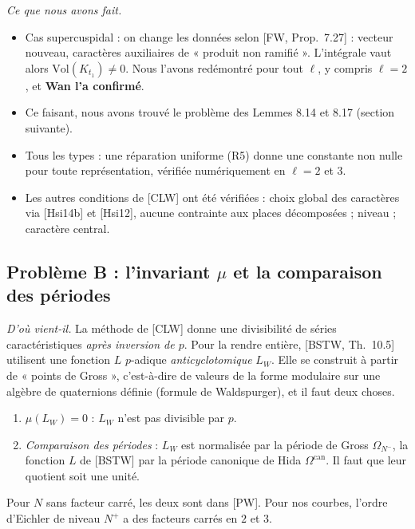 \documentclass[11pt]{amsart}
\newcommand{\Vol}{\mathrm{Vol}}
\begin{document}
\emph{Ce que nous avons fait.}
\begin{itemize}
\item Cas supercuspidal : on change les données selon [FW, Prop.~7.27] : vecteur nouveau, caractères auxiliaires de « produit non ramifié ». L'intégrale vaut alors $\Vol(K_{t_1})\neq0$. Nous l'avons redémontré pour tout $\ell$, y compris $\ell=2$, et \textbf{Wan l'a confirmé}.
\item Ce faisant, nous avons trouvé le problème des Lemmes 8.14 et 8.17 (section suivante).
\item Tous les types : une réparation uniforme (R5) donne une constante non nulle pour toute représentation, vérifiée numériquement en $\ell=2$ et $3$.
\item Les autres conditions de [CLW] ont été vérifiées : choix global des caractères via [Hsi14b] et [Hsi12], aucune contrainte aux places décomposées ; niveau ; caractère central.
\end{itemize}

\subsection*{Problème B : l'invariant $\mu$ et la comparaison des périodes}
\emph{D'où vient-il.} La méthode de [CLW] donne une divisibilité de séries caractéristiques \emph{après inversion de $p$}. Pour la rendre entière, [BSTW, Th.~10.5] utilisent une fonction $L$ $p$-adique \emph{anticyclotomique} $L_W$. Elle se construit à partir de « points de Gross », c'est-à-dire de valeurs de la forme modulaire sur une algèbre de quaternions définie (formule de Waldspurger), et il faut deux choses.
\begin{enumerate}[label=(B\arabic*)]
\item \emph{$\mu(L_W)=0$} : $L_W$ n'est pas divisible par $p$.
\item \emph{Comparaison des périodes} : $L_W$ est normalisée par la période de Gross $\Omega_{N^-}$, la fonction $L$ de [BSTW] par la période canonique de Hida $\Omega^{\mathrm{can}}$. Il faut que leur quotient soit une unité.
\end{enumerate}
Pour $N$ sans facteur carré, les deux sont dans [PW]. Pour nos courbes, l'ordre d'Eichler de niveau $N^+$ a des facteurs carrés en $2$ et $3$.
\end{document}
